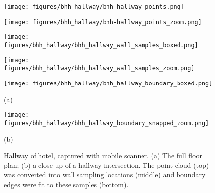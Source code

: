 \documentclass[10pt,twocolumn,letterpaper]{article}
\begin{document}
\begin{figure}[t]

\begin{minipage}[b]{0.47\linewidth}
  \centering
  \centerline{\texttt{[image: figures/bhh\_hallway/bhh-hallway\_points.png]}}
\end{minipage}
\hfill
\begin{minipage}[b]{0.47\linewidth}
  \centering
  \centerline{\texttt{[image: figures/bhh\_hallway/bhh-hallway\_points\_zoom.png]}}
\end{minipage}
\linebreak 
\linebreak 

\begin{minipage}[b]{0.49\linewidth}
  \centering
  \centerline{\texttt{[image: figures/bhh\_hallway/bhh\_hallway\_wall\_samples\_boxed.png]}}
\end{minipage}
\hfill
\begin{minipage}[b]{0.49\linewidth}
  \centering
  \centerline{\texttt{[image: figures/bhh\_hallway/bhh\_hallway\_wall\_samples\_zoom.png]}}
\end{minipage}
\linebreak
\linebreak 

\begin{minipage}[b]{0.49\linewidth}
  \centering
  \centerline{\texttt{[image: figures/bhh\_hallway/bhh\_hallway\_boundary\_boxed.png]}}
  \centerline{(a)}
\end{minipage}
\hfill
\begin{minipage}[b]{0.49\linewidth}
  \centering
  \centerline{\texttt{[image: figures/bhh\_hallway/bhh\_hallway\_boundary\_snapped\_zoom.png]}}
  \centerline{(b)}
\end{minipage}
\linebreak 
\linebreak 

\caption{Hallway of hotel, captured with mobile scanner.  (a) The full floor plan; (b) a close-up of a hallway intersection.  The point cloud (top) was converted into wall sampling locations (middle) and boundary edges were fit to these samples (bottom).}
\label{fig:bhh_hallway_results}

\end{figure}

\end{document}
